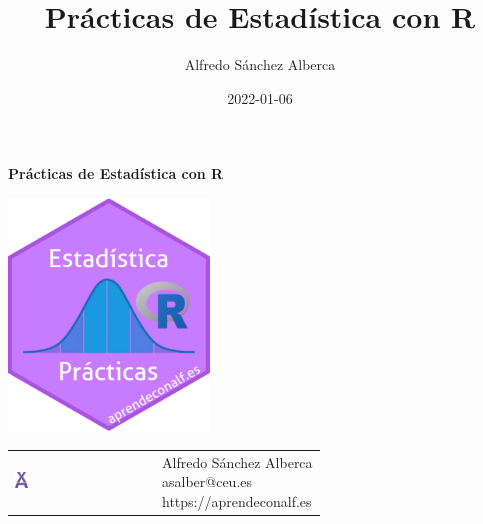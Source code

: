 \documentclass[
  a4paper,
]{scrreport}
\title{Prácticas de Estadística con R}
\author{Alfredo Sánchez Alberca}
\date{2022-01-06}
\renewcommand*\contentsname{Tabla de contenidos}
\newcommand\contentsname{Tabla de contenidos}
\theoremstyle{definition}
\theoremstyle{remark}
\begin{document}
\begin{titlepage}

\begin{center}
\vspace*{5cm}

\Huge
{\textbf{\textsf{Prácticas de Estadística con R}}}

\vspace{0.5cm}
\LARGE
{\textbf{\textsf{}}}

\vspace{1.5cm}

\includegraphics[width=0.4\textwidth]{img/logos/sticker-estadistica-r.png}
\end{center}

\vfill

\begin{flushleft}
\begin{tabular}{ll}
\includegraphics[width=0.1\textwidth]{img/logos/aprendeconalf.png} & \parbox[b]{5cm}{\Large\textsf{Alfredo
Sánchez
Alberca}\\ \textsf{asalber@ceu.es} \\ \textsf{https://aprendeconalf.es}}
\end{tabular}
\end{flushleft}
\end{titlepage}\ifdefined\Shaded\renewenvironment{Shaded}{\begin{tcolorbox}[breakable, interior hidden, frame hidden, boxrule=0pt, borderline west={3pt}{0pt}{shadecolor}, sharp corners, enhanced]}{\end{tcolorbox}}\fi

\renewcommand*\contentsname{Tabla de contenidos}
{
\hypersetup{linkcolor=}
\setcounter{tocdepth}{2}
\tableofcontents
}
\end{document}
